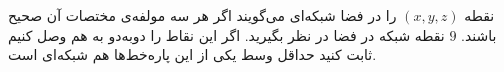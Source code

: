     \p 
نقطه
$(x, y, z)$
را در فضا شبکه‌ای می‌گویند اگر هر سه مولفه‌ی مختصات آن صحیح باشند.
$9$
نقطه شبکه در فضا در نظر بگیرید. اگر این نقاط را دوبه‌دو به هم وصل کنیم ثابت کنید حداقل وسط یکی از این پاره‌خط‌ها هم شبکه‌ای است.